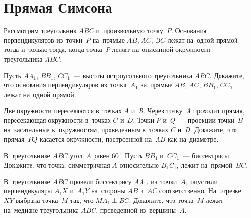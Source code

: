 
\section*{Прямая Симсона}


Рассмотрим треугольник $ABC$ и~произвольную точку~$P$.
Основания перпендикуляров из~точки~$P$ на~прямые $AB$, $AC$, $BC$ лежат
на~одной прямой тогда и~только тогда, когда точка~$P$ лежит на~описанной
окружности треугольника $ABC$.

\begin{problems}


\item
Пусть $A A_1$, $B B_1$, $C C_1$~--- высоты остроугольного треугольника $ABC$.
Докажите, что основания перпендикуляров из~точки~$A_1$ на~прямые
$AB$, $AC$, $B B_1$, $C C_1$ лежат на~одной прямой.

\item
Две окружности пересекаются в~точках $A$ и~$B$.
Через точку~$A$ проходит прямая, пересекающая окружности в~точках $C$ и~$D$.
Точки $P$ и~$Q$~--- проекции точки~$B$ на~касательные к~окружностям,
проведенным в~точках $C$ и~$D$.
Докажите, что прямая~$PQ$ касается окружности, построенной на~$AB$ как
на~диаметре.

\item
В~треугольнике $ABC$ угол~$A$ равен $60^{\circ}$.
Пусть $B B_1$ и~$C C_1$~--- биссектрисы.
Докажите, что точка, симметричная $A$ относительно $B_1 C_1$, лежит
на~прямой~$BC$.

\item
В~треугольнике $ABC$ провели биссектрису $A A_1$, из~точки~$A_1$ опустили
перпендикуляры $A_1 X$ и~$A_1 Y$ на~стороны $AB$ и~$AC$ соответственно.
На~отрезке~$XY$ выбрана точка~$M$ так, что $M A_1 \perp BC$.
Докажите, что точка~$M$ лежит на~медиане треугольника $ABC$, проведенной
из~вершины~$A$.



\end{problems}
